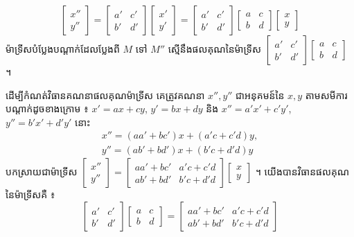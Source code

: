 \[ \begin{bmatrix} x''\\ y'' \end{bmatrix} = \begin{bmatrix} a' & c'\\ b' & d' \end{bmatrix}\begin{bmatrix} x'\\ y' \end{bmatrix} = \begin{bmatrix} a' & c'\\ b' & d' \end{bmatrix}\begin{bmatrix} a & c\\ b & d \end{bmatrix}\begin{bmatrix} x\\ y \end{bmatrix} \]
ម៉ាទ្រីសបំប្លែងបណ្ដាក់ដែលប្លែងពី $M$ ទៅ $M''$ ស្មើនឹងផលគុណនៃម៉ាទ្រីស $\begin{bmatrix} a' & c'\\ b' & d' \end{bmatrix}\begin{bmatrix} a & c\\ b & d \end{bmatrix}$ ។

ដើម្បីកំណត់វិធានគណនាផលគុណម៉ាទ្រីស គេត្រូវគណនា $x'', y''$ ជាអនុគមន៍នៃ $x, y$ តាមសមីការបណ្ដាក់ដូចខាងក្រោម ៖ $x' = ax + cy$, $y' = bx + dy$ និង $x'' = a'x' + c'y'$, $y'' = b'x' + d'y'$ នោះ
\[
\begin{gathered}
x'' = (aa' + bc')x + (a'c + c'd)y,\\
y'' = (ab' + bd')x + (b'c + d'd)y
\end{gathered}
\]
បកស្រាយជាម៉ាទ្រីស $\begin{bmatrix} x''\\ y'' \end{bmatrix} = \begin{bmatrix} aa' + bc' & a'c + c'd\\ ab' + bd' & b'c + d'd \end{bmatrix}\begin{bmatrix} x\\ y \end{bmatrix}$ ។ យើងបានវិធានផលគុណនៃម៉ាទ្រីសគឺ ៖
\[ \begin{bmatrix} a' & c'\\ b' & d' \end{bmatrix}\begin{bmatrix} a & c\\ b & d \end{bmatrix} = \begin{bmatrix} aa' + bc' & a'c + c'd\\ ab' + bd' & b'c + d'd \end{bmatrix} \]

